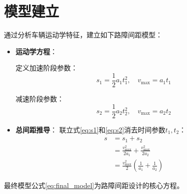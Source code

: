 \section{模型建立}

通过分析车辆运动学特征，建立如下路障间距模型：

\begin{itemize}
    \item \textbf{运动学方程}：
    
    定义加速阶段参数：
    \begin{equation}\label{eq:s1}
        s_1 = \frac{1}{2}a_1 t_1^2,\quad v_{\max} = a_1 t_1
    \end{equation}
    
    减速阶段参数：
    \begin{equation}\label{eq:s2}
        s_2 = \frac{1}{2}a_2 t_2^2,\quad v_{\max} = a_2 t_2
    \end{equation}

    \item \textbf{总间距推导}：
    联立式\eqref{eq:s1}和\eqref{eq:s2}消去时间参数$t_1,t_2$：
    \begin{align}
        s &= s_1 + s_2 \nonumber \\
          &= \frac{v_{\max}^2}{2a_1} + \frac{v_{\max}^2}{2a_2} \nonumber \\
          &= \frac{v_{\max}^2}{2}\left(\frac{1}{a_1} + \frac{1}{a_2}\right) \label{eq:final_model}
    \end{align}
\end{itemize}

最终模型公式\eqref{eq:final_model}为路障间距设计的核心方程。
